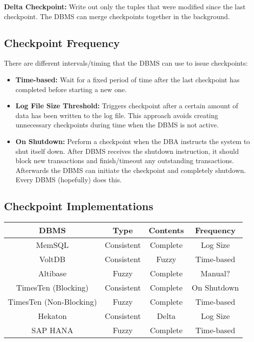 \documentclass[11pt]{article}
\begin{document}
\textbf{Delta Checkpoint:} Write out only the tuples that were modified since the last checkpoint. The DBMS can merge checkpoints together in the background.

\subsection*{Checkpoint Frequency}
There are different intervals/timing that the DBMS can use to issue checkpoints:
\begin{itemize}
  \item \textbf{Time-based:} Wait for a fixed period of time after the last checkpoint has completed before starting a new one.
  \item \textbf{Log File Size Threshold:} Triggers checkpoint after a certain amount of data has been written to the log file. This approach avoids creating unnecessary checkpoints during time when the DBMS is not active.
  \item \textbf{On Shutdown:} Perform a checkpoint when the DBA instructs the system to shut itself down. After DBMS receives the shutdown instruction, it should block new transactions and finish/timeout any outstanding transactions. Afterwards the DBMS can initiate the checkpoint and completely shutdown. Every DBMS (hopefully) does this.
\end{itemize}

\subsection*{Checkpoint Implementations}
\begin{center}
 \begin{tabular}{|c|c|c|c|} 
     \hline
     DBMS & Type & Contents & Frequency \\ [0.5ex] 
     \hline\hline
     MemSQL & Consistent & Complete & Log Size \\ 
     \hline
     VoltDB & Consistent & Fuzzy & Time-based \\
     \hline
     Altibase & Fuzzy & Complete & Manual? \\
     \hline
     TimesTen (Blocking) & Consistent & Complete & On Shutdown \\
     \hline
     TimesTen (Non-Blocking) & Fuzzy & Complete & Time-based \\
     \hline
     Hekaton & Consistent & Delta & Log Size \\
     \hline
     SAP HANA & Fuzzy & Complete & Time-based \\ 
 \hline
\end{tabular}
\end{center}
\end{document}

